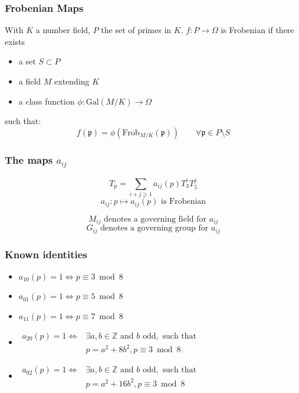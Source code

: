 \documentclass[12pt]{beamer}
\begin{document}
	\begin{frame}
		\frametitle{Frobenian Maps}
		With $K$ a number field, $P$ the set of primes in $K$.
		$f: P \to \Omega$ is Frobenian if there exists
		\begin{itemize}
			\item a set $S \subset P$
			\item a field $M$ extending $K$
			\item a class function $\phi: \text{Gal}(M/K) \to \Omega$
		\end{itemize}
		such that:
		$$f(\mathfrak{p}) = \phi( \text{Frob}_{M/K}(\mathfrak{p})) \qquad \forall \mathfrak{p} \in P \setminus S$$
	\end{frame}

	\begin{frame}
		\frametitle{The maps $a_{ij}$}
		$$T_p = \sum_{i+j \geq 1} a_{ij}(p) T_3^iT_5^j$$
		\vspace{1cm}
		$$a_{ij}: p \mapsto a_{ij}(p) \text{ is Frobenian}$$
		
		$$M_{ij} \text{ denotes a governing field for } a_{ij}$$
		$$G_{ij} \text{ denotes a governing group for } a_{ij}$$
	\end{frame}

	\begin{frame}
		\frametitle{Known identities}
		\begin{itemize}
			\item
			$a_{10}(p)=1 \iff p \equiv 3 \bmod 8$
			\item
			$a_{01}(p)=1 \iff p \equiv 5 \bmod 8$
			\item
			$a_{11}(p)=1 \iff p \equiv 7 \bmod 8$
			\item 
			$\begin{matrix}
				a_{20}(p)=1 \iff &\exists a,b \in \mathbb{Z} \text{ and } b \text{ odd},\text{ such that }\\
				&p=a^2+8b^2, p \equiv 3 \bmod 8
			\end{matrix}$
			\item
			$\begin{matrix}
				a_{02}(p)=1 \iff &\exists a,b \in \mathbb{Z} \text{ and } b \text{ odd},\text{ such that }\\
				&p=a^2+16b^2, p \equiv 3 \bmod 8
			\end{matrix}$
		\end{itemize}
	\end{frame}
\end{document}
